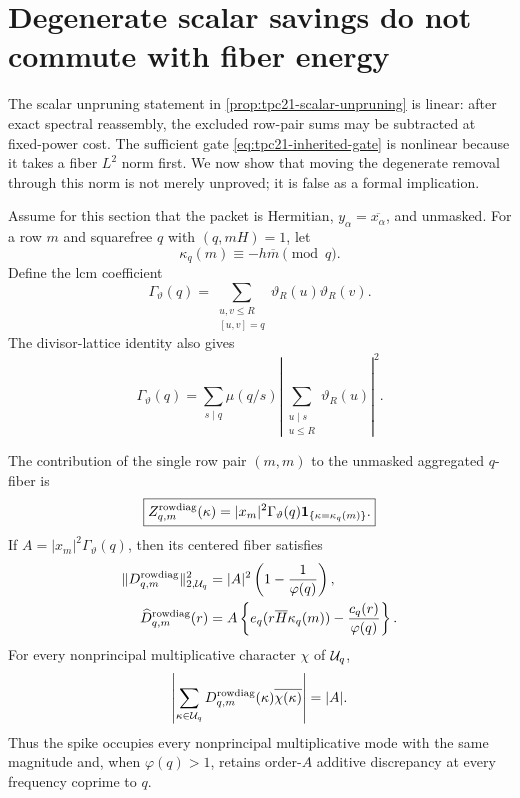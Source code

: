 \section{Degenerate scalar savings do not commute with fiber energy}
\label{sec:tpc21-nonlinear}

The scalar unpruning statement in
\cref{prop:tpc21-scalar-unpruning} is linear: after exact spectral
reassembly, the excluded row-pair sums may be subtracted at fixed-power
cost.  The sufficient gate \eqref{eq:tpc21-inherited-gate} is nonlinear
because it takes a fiber \(L^2\) norm first.  We now show that moving the
degenerate removal through this norm is not merely unproved; it is false
as a formal implication.

Assume for this section that the packet is Hermitian,
\(y_\alpha=\overline{x_\alpha}\), and unmasked.  For a row \(m\) and
squarefree \(q\) with \((q,mH)=1\), let
\begin{equation}
 \kappa_q(m)\equiv-h\overline m\pmod q.
 \label{eq:tpc21-row-kappa}
\end{equation}
Define the lcm coefficient
\begin{equation}
 \Gamma_\vartheta(q)
 =\sum_{\substack{u,v\le R\\{}[u,v]=q}}
 \vartheta_R(u)\vartheta_R(v).
 \label{eq:tpc21-Gamma-theta}
\end{equation}
The divisor-lattice identity also gives
\begin{equation}
 \Gamma_\vartheta(q)
 =\sum_{s\mid q}\mu(q/s)
 \left|\sum_{\substack{u\mid s\\u\le R}}
 \vartheta_R(u)\right|^2.
 \label{eq:tpc21-Gamma-prefix}
\end{equation}

\begin{proposition}
\label{prop:tpc21-row-diagonal-spike}
The contribution of the single row pair \((m,m)\) to the unmasked
aggregated \(q\)-fiber is
\begin{equation}
 \boxed{
 Z_{q,m}^{\rm rowdiag}(\kappa)
 =|x_m|^2\Gamma_\vartheta(q)
  \mathbf 1_{\{\kappa=\kappa_q(m)\}}.}
 \label{eq:tpc21-row-diagonal-spike}
\end{equation}
If \(A=|x_m|^2\Gamma_\vartheta(q)\), then its centered fiber satisfies
\begin{align}
 \lVert D_{q,m}^{\rm rowdiag}\rVert_{2,\mathcal U_q}^2
 &=|A|^2\left(1-\frac1{\varphi(q)}\right),
 \label{eq:tpc21-row-diagonal-L2}\\
 \widehat D_{q,m}^{\rm rowdiag}(r)
 &=A\left\{e_q(r\overline H\kappa_q(m))
       -\frac{c_q(r)}{\varphi(q)}\right\}.
 \label{eq:tpc21-row-diagonal-additive}
\end{align}
For every nonprincipal multiplicative character \(\chi\) of
\(\mathcal U_q\),
\begin{equation}
 \left|\sum_{\kappa\in\mathcal U_q}
 D_{q,m}^{\rm rowdiag}(\kappa)\overline{\chi(\kappa)}\right|
 =|A|.
 \label{eq:tpc21-row-diagonal-multiplicative}
\end{equation}
Thus the spike occupies every nonprincipal multiplicative mode with the
same magnitude and, when \(\varphi(q)>1\), retains order-\(A\) additive
discrepancy at every frequency coprime to \(q\).
\end{proposition}

